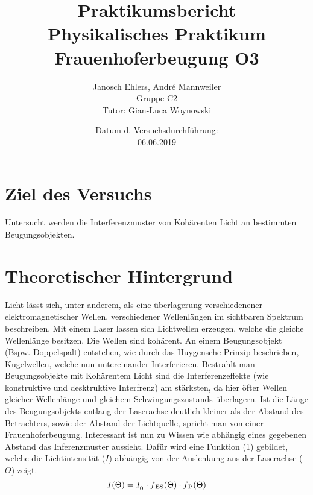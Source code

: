 \documentclass[11pt]{article}
\begin{document}
\title{Praktikumsbericht\\Physikalisches Praktikum\\Frauenhoferbeugung O3}
\author{Janosch Ehlers, André Mannweiler\\Gruppe C2\\Tutor: Gian-Luca Woynowski}
\date{Datum d. Versuchsdurchführung:\\06.06.2019}
\maketitle
\newpage

\section{Ziel des Versuchs}
Untersucht werden die Interferenzmuster von Kohärenten Licht an bestimmten Beugungsobjekten.
\section{Theoretischer Hintergrund}
Licht lässt sich, unter anderem, als eine überlagerung verschiedenener elektromagnetischer Wellen, verschiedener Wellenlängen im sichtbaren Spektrum beschreiben. Mit einem Laser lassen sich Lichtwellen erzeugen, welche die gleiche Wellenlänge besitzen. Die Wellen sind kohärent. An einem Beugungsobjekt (Bspw. Doppelspalt) entstehen, wie durch das Huygensche Prinzip beschrieben, Kugelwellen, welche nun untereinander Interferieren. Bestrahlt man Beugungsobjekte mit Kohärentem Licht sind die Interferenzeffekte (wie konstruktive und desktruktive Interfrenz) am stärksten, da hier öfter Wellen gleicher Wellenlänge und gleichem Schwingungszustands überlagern. Ist die Länge des Beugungsobjekts entlang der Laserachse deutlich kleiner als der Abstand des Betrachters, sowie der Abstand der Lichtquelle, spricht man von einer Frauenhoferbeugung. Interessant ist nun zu Wissen wie abhängig eines gegebenen Abstand das Inferenzmuster aussieht. Dafür wird eine Funktion (1) gebildet, welche die Lichtintensität ($I$) abhängig von der Auslenkung aus der Laserachse ($\Theta$) zeigt.
	\begin{equation}
	I(\Theta )=I_\textsubscript{0}\cdot f\textsubscript{ES}(\Theta )\cdot f\textsubscript{P}(\Theta )
	\end{equation}
\end{document}
